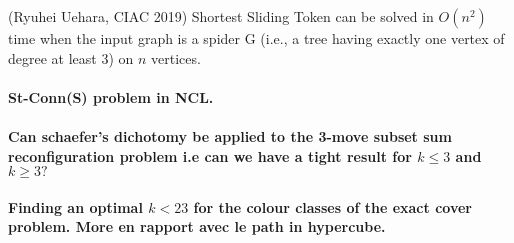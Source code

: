 \begin{theorem}(Ryuhei Uehara, CIAC 2019)
Shortest Sliding Token can be solved in $O(n^2)$ time when the input graph is a spider G (i.e., a tree having exactly one
vertex of degree at least $3$) on $n$ vertices.
\end{theorem}


\paragraph{St-Conn(S) problem in NCL.}

\paragraph{Can schaefer's dichotomy be applied to the 3-move subset sum reconfiguration problem i.e can we have a tight result for $k \leq 3$ and $k \geq 3 ? $}

\paragraph{Finding an optimal $k < 23$ for the colour classes of the exact cover problem. More en rapport avec le path in hypercube.}
